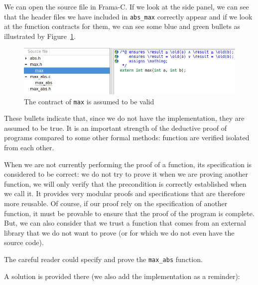 \documentclass[12pt,francais,]{scrbook}
\begin{document}
We can open the source file in Frama-C. If we look at the side panel, we
can see that the header files we have included in \texttt{abs\_max}
correctly appear and if we look at the function contracts for them, we
can see some blue and green bullets as illustrated by
Figure~\ref{fig:2-4-max_abs}.

\begin{figure}[htbp]
\centering
\includegraphics[scale=0.5]{2-4-max_abs.png}
\caption{The contract of \texttt{max} is assumed to be valid}
\label{fig:2-4-max_abs}
\end{figure}

These bullets indicate that, since we do not have the implementation,
they are assumed to be true. It is an important strength of the
deductive proof of programs compared to some other formal methods:
function are verified isolated from each other.

When we are not currently performing the proof of a function, its
specification is considered to be correct: we do not try to prove it
when we are proving another function, we will only verify that the
precondition is correctly established when we call it. It provides very
modular proofs and specifications that are therefore more reusable. Of
course, if our proof rely on the specification of another function, it
must be provable to ensure that the proof of the program is complete.
But, we can also consider that we trust a function that comes from an
external library that we do not want to prove (or for which we do not
even have the source code).

The careful reader could specify and prove the \texttt{max\_abs}
function.

A solution is provided there (we also add the implementation as a
reminder):
\end{document}
